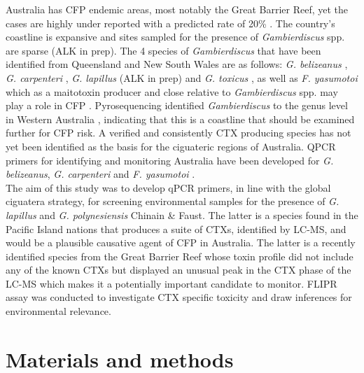 \documentclass[12pt]{article}
\begin{document}
Australia has CFP endemic areas, most notably the Great Barrier Reef, yet the cases are highly under reported with a predicted rate of 20\% \citep{lewis2006ciguatera}. The country's coastline is expansive and sites sampled for the presence of \emph{Gambierdiscus} spp. are sparse (ALK in prep). The 4 species of \emph{Gambierdiscus} that have been identified from Queensland and New South Wales are as follows: \emph{G. belizeanus} \citep{murray2014molecular}, \emph{G. carpenteri} \citep{kohli2014high}, \emph{G. lapillus} (ALK in prep) and \emph{G. toxicus} \citep{hallegraeff2010algae}, as well as \emph{F. yasumotoi} \citep{murray2014molecular} which as a maitotoxin producer and close relative to \emph{Gambierdiscus} spp. may play a role in CFP \citep{kohli2014feeding}. Pyrosequencing identified \emph{Gambierdiscus} to the genus level in Western Australia \citep{kohli2014cob} , indicating that this is a coastline that should be examined further for CFP risk. A verified and consistently CTX producing species has not yet been identified as the basis for the ciguateric regions of Australia.
QPCR primers for identifying and monitoring Australia have been developed for \emph{G. belizeanus}, \emph{G. carpenteri} and \emph{F. yasumotoi} \citep{nishimura2016quantitative,vandersea2012development}. \\
The aim of this study was to develop qPCR primers, in line with the global ciguatera strategy, for screening environmental samples for the presence of \emph{G. lapillus} and \emph{G. polynesiensis} Chinain \& Faust. The latter is a species found in the Pacific Island nations that produces a suite of CTXs, identified by LC-MS, and would be a plausible causative agent of CFP in Australia. The latter is a recently identified species from the Great Barrier Reef whose toxin profile did not include any of the known CTXs but displayed an unusual peak in the CTX phase of the LC-MS which makes it a potentially important candidate to monitor. FLIPR assay was conducted to investigate CTX specific toxicity and draw inferences for environmental relevance.
\newpage
\section{Materials and methods}
\end{document}
